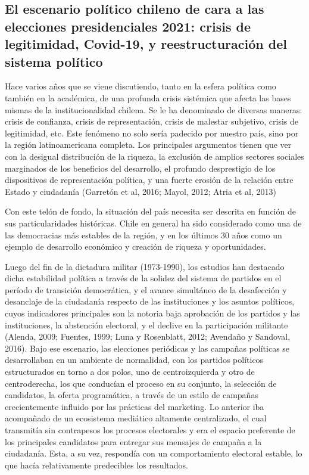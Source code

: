 \documentclass[
  10pt,
  letterpaper,
]{report}
\begin{document}
\hypertarget{el-escenario-poluxedtico-chileno-de-cara-a-las-elecciones-presidenciales-2021-crisis-de-legitimidad-covid-19-y-reestructuraciuxf3n-del-sistema-poluxedtico}{%
\subsection{El escenario político chileno de cara a las elecciones
presidenciales 2021: crisis de legitimidad, Covid-19, y reestructuración
del sistema
político}\label{el-escenario-poluxedtico-chileno-de-cara-a-las-elecciones-presidenciales-2021-crisis-de-legitimidad-covid-19-y-reestructuraciuxf3n-del-sistema-poluxedtico}}

Hace varios años que se viene discutiendo, tanto en la esfera política
como también en la académica, de una profunda crisis sistémica que
afecta las bases mismas de la institucionalidad chilena. Se le ha
denominado de diversas maneras: crisis de confianza, crisis de
representación, crisis de malestar subjetivo, crisis de legitimidad,
etc. Este fenómeno no solo sería padecido por nuestro país, sino por la
región latinoamericana completa. Los principales argumentos tienen que
ver con la desigual distribución de la riqueza, la exclusión de amplios
sectores sociales marginados de los beneficios del desarrollo, el
profundo desprestigio de los dispositivos de representación política, y
una fuerte erosión de la relación entre Estado y ciudadanía (Garretón et
al, 2016; Mayol, 2012; Atria et al, 2013)

Con este telón de fondo, la situación del país necesita ser descrita en
función de sus particularidades históricas. Chile en general ha sido
considerado como una de las democracias más estables de la región, y en
los últimos 30 años como un ejemplo de desarrollo económico y creación
de riqueza y oportunidades.

Luego del fin de la dictadura militar (1973-1990), los estudios han
destacado dicha estabilidad política a través de la solidez del sistema
de partidos en el período de transición democrática, y el avance
simultáneo de la desafección y desanclaje de la ciudadanía respecto de
las instituciones y los asuntos políticos, cuyos indicadores principales
son la notoria baja aprobación de los partidos y las instituciones, la
abstención electoral, y el declive en la participación militante
(Alenda, 2009; Fuentes, 1999; Luna y Rosenblatt, 2012; Avendaño y
Sandoval, 2016). Bajo ese escenario, las elecciones periódicas y las
campañas políticas se desarrollaban en un ambiente de normalidad, con
los partidos políticos estructurados en torno a dos polos, uno de
centroizquierda y otro de centroderecha, los que conducían el proceso en
su conjunto, la selección de candidatos, la oferta programática, a
través de un estilo de campañas crecientemente influido por las
prácticas del marketing. Lo anterior iba acompañado de un ecosistema
mediático altamente centralizado, el cual transmitía sin contrapesos los
procesos electorales y era el espacio preferente de los principales
candidatos para entregar sus mensajes de campaña a la ciudadanía. Esta,
a su vez, respondía con un comportamiento electoral estable, lo que
hacía relativamente predecibles los resultados.
\end{document}
